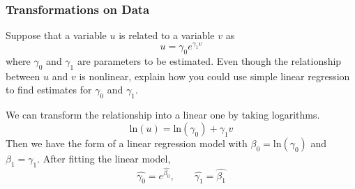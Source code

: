 \begin{comment}
\begin{enumerate}
\item Fit a model with \texttt{Mileage} as the response and
  \texttt{Weight}, \texttt{Disp.}, and \texttt{Type} as predictors.
  \texttt{Type} is a categorical variable with six levels: Compact,
  Large, Medium, Small, Sporty, and Van.
  Plot \texttt{Mileage} vs the fitted values. How does this model
  compare to the initial model?
\item Fit a model with \texttt{Fuel} as the response and
  \texttt{Weight} and \texttt{Disp.} as the predictors.  Plot
  \texttt{Fuel} vs the fitted values.  How does this model compare
  to the initial model?
\end{enumerate}

\end{comment}

\subsubsection*{Transformations on Data}
  Suppose that a variable $u$ is related to a variable $v$ as
\[
u = \gamma_0e^{\gamma_1v}
\]
where $\gamma_0$ and $\gamma_1$ are parameters to be estimated.  Even
though the relationship between $u$ and $v$ is nonlinear, explain how
you could use simple linear regression to find estimates for
$\gamma_0$ and $\gamma_1$.

We can transform the relationship into a linear one
by taking logarithms.
\[
\text{ln}(u) = \text{ln}(\gamma_0) + \gamma_1v
\]
Then we have the form of a linear regression model with $\beta_0 = \text{ln}(\gamma_0)$
and $\beta_1 = \gamma_1$. After fitting the linear model,
\[
\hat{\gamma_0}=e^{\hat{\beta_0}}, \qquad \hat{\gamma_1} = \hat{\beta_1}
\]

